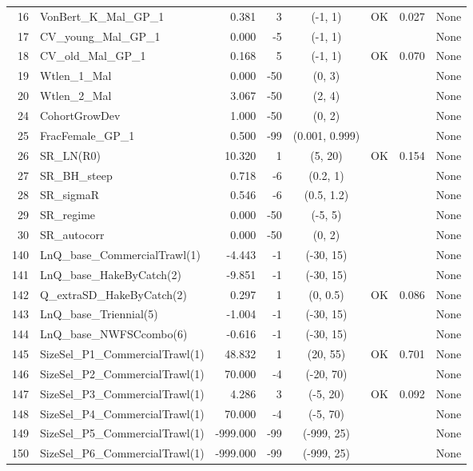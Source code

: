 \documentclass[12pt,]{article}
\begin{document}
\begin{landscape}
\begin{longtable}{rlrrcccl}
  16 & VonBert\_K\_Mal\_GP\_1 & 0.381 & 3 & (-1, 1) & OK & 0.027 & None \\ 
  17 & CV\_young\_Mal\_GP\_1 & 0.000 & -5 & (-1, 1) &  &  & None \\ 
  18 & CV\_old\_Mal\_GP\_1 & 0.168 & 5 & (-1, 1) & OK & 0.070 & None \\ 
  19 & Wtlen\_1\_Mal & 0.000 & -50 & (0, 3) &  &  & None \\ 
  20 & Wtlen\_2\_Mal & 3.067 & -50 & (2, 4) &  &  & None \\ 
  24 & CohortGrowDev & 1.000 & -50 & (0, 2) &  &  & None \\ 
  25 & FracFemale\_GP\_1 & 0.500 & -99 & (0.001, 0.999) &  &  & None \\ 
  26 & SR\_LN(R0) & 10.320 & 1 & (5, 20) & OK & 0.154 & None \\ 
  27 & SR\_BH\_steep & 0.718 & -6 & (0.2, 1) &  &  & None \\ 
  28 & SR\_sigmaR & 0.546 & -6 & (0.5, 1.2) &  &  & None \\ 
  29 & SR\_regime & 0.000 & -50 & (-5, 5) &  &  & None \\ 
  30 & SR\_autocorr & 0.000 & -50 & (0, 2) &  &  & None \\ 
  140 & LnQ\_base\_CommercialTrawl(1) & -4.443 & -1 & (-30, 15) &  &  & None \\ 
  141 & LnQ\_base\_HakeByCatch(2) & -9.851 & -1 & (-30, 15) &  &  & None \\ 
  142 & Q\_extraSD\_HakeByCatch(2) & 0.297 & 1 & (0, 0.5) & OK & 0.086 & None \\ 
  143 & LnQ\_base\_Triennial(5) & -1.004 & -1 & (-30, 15) &  &  & None \\ 
  144 & LnQ\_base\_NWFSCcombo(6) & -0.616 & -1 & (-30, 15) &  &  & None \\ 
  145 & SizeSel\_P1\_CommercialTrawl(1) & 48.832 & 1 & (20, 55) & OK & 0.701 & None \\ 
  146 & SizeSel\_P2\_CommercialTrawl(1) & 70.000 & -4 & (-20, 70) &  &  & None \\ 
  147 & SizeSel\_P3\_CommercialTrawl(1) & 4.286 & 3 & (-5, 20) & OK & 0.092 & None \\ 
  148 & SizeSel\_P4\_CommercialTrawl(1) & 70.000 & -4 & (-5, 70) &  &  & None \\ 
  149 & SizeSel\_P5\_CommercialTrawl(1) & -999.000 & -99 & (-999, 25) &  &  & None \\ 
  150 & SizeSel\_P6\_CommercialTrawl(1) & -999.000 & -99 & (-999, 25) &  &  & None \\ 

\end{longtable}
\end{landscape}
\end{document}
